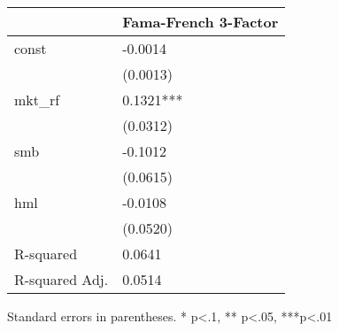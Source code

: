 \begin{table}
\caption{}
\label{}
\begin{center}
\begin{tabular}{ll}
\hline
               & Fama-French 3-Factor  \\
\hline
const          & -0.0014               \\
               & (0.0013)              \\
mkt\_rf        & 0.1321***             \\
               & (0.0312)              \\
smb            & -0.1012               \\
               & (0.0615)              \\
hml            & -0.0108               \\
               & (0.0520)              \\
R-squared      & 0.0641                \\
R-squared Adj. & 0.0514                \\
\hline
\end{tabular}
\end{center}
\end{table}
\bigskip
Standard errors in parentheses. \newline 
* p<.1, ** p<.05, ***p<.01